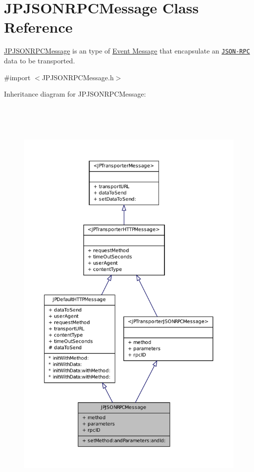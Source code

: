 \hypertarget{a00018}{
\section{JPJSONRPCMessage Class Reference}
\label{a00018}
}


\hyperlink{a00018}{JPJSONRPCMessage} is an type of \hyperlink{a00006}{Event Message} that encapsulate an \href{http://en.wikipedia.org/wiki/JSON-RPC}{\tt JSON-\/RPC} data to be transported.  




{\ttfamily \#import $<$JPJSONRPCMessage.h$>$}



Inheritance diagram for JPJSONRPCMessage:
\nopagebreak
\begin{figure}[H]
\begin{center}
\leavevmode
\includegraphics[height=600pt]{a00115}
\end{center}
\end{figure}


